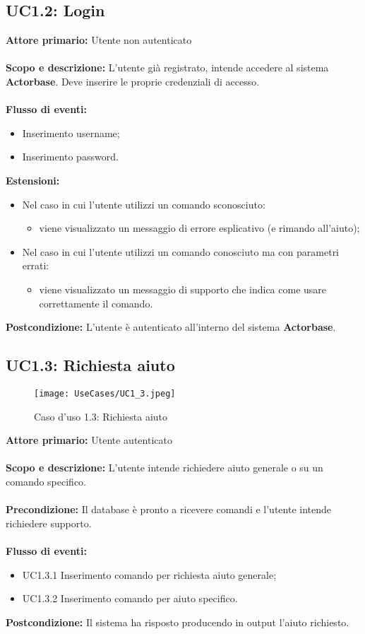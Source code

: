 \documentclass{scalatekids-article}
\begin{document}
\subsection{UC1.2: Login}
\textbf{Attore primario:} Utente non autenticato\\ \\
\textbf{Scopo e descrizione:} L’utente già registrato, intende accedere al sistema \textbf{Actorbase}. Deve inserire le proprie credenziali di accesso. \\ \\
\textbf{Flusso di eventi:}
\begin{itemize}
\item Inserimento username;
\item Inserimento password.
\end{itemize}
\textbf{Estensioni:}
\begin{itemize}
\item Nel caso in cui l'utente utilizzi un comando sconosciuto:
  \begin{itemize}
  \item viene visualizzato un messaggio di errore esplicativo (e rimando all'aiuto);
  \end{itemize}
\item Nel caso in cui l'utente utilizzi un comando conosciuto ma con parametri errati:
  \begin{itemize}
  \item viene visualizzato un messaggio di supporto che indica come usare correttamente il comando.
  \end{itemize}
\end{itemize}
\textbf{Postcondizione:} L'utente è autenticato all'interno del sistema \textbf{Actorbase}.
\subsection{UC1.3: Richiesta aiuto}
\begin{figure}[H]
  \begin{center}
    \texttt{[image: UseCases/UC1\_3.jpeg]}
    \caption{Caso d'uso 1.3: Richiesta aiuto}
  \end{center}
\end{figure}
\textbf{Attore primario:} Utente autenticato\\ \\
\textbf{Scopo e descrizione:} L'utente intende richiedere aiuto generale o su un comando specifico.\\ \\
\textbf{Precondizione:} Il database è pronto a ricevere comandi e l'utente intende richiedere supporto.\\ \\
\textbf{Flusso di eventi:}
\begin{itemize}
\item UC1.3.1 Inserimento comando per richiesta aiuto generale;
\item UC1.3.2 Inserimento comando per aiuto specifico.
\end{itemize}
\textbf{Postcondizione:} Il sistema ha risposto producendo in output l'aiuto richiesto.
\end{document}
